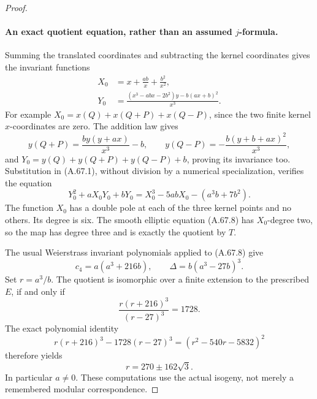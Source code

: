 \begin{proof}
\paragraph{An exact quotient equation, rather than an assumed \(j\)-formula.}
Summing the translated coordinates and subtracting the kernel
coordinates gives the invariant functions
\[
\begin{split}
 X_0&=x+\frac{ab}{x}+\frac{b^2}{x^2},\\
 Y_0&=\frac{(x^3-abx-2b^2)y-b(ax+b)^2}{x^3}.
\end{split}                                                   \tag{A.67.7}
\]
For example \(X_0=x(Q)+x(Q+P)+x(Q-P)\), since the two finite
kernel \(x\)-coordinates are zero. The addition law gives
\[
 y(Q+P)=\frac{by(y+ax)}{x^3}-b,\qquad
 y(Q-P)=-\frac{b(y+b+ax)^2}{x^3},
\]
and \(Y_0=y(Q)+y(Q+P)+y(Q-P)+b\), proving its invariance too.
Substitution in (A.67.1), without division by a numerical
specialization, verifies the equation
\[
 Y_0^2+aX_0Y_0+bY_0
       =X_0^3-5abX_0-(a^3b+7b^2).
                                                               \tag{A.67.8}
\]
The function \(X_0\) has a double pole at each of the three
kernel points and no others. Its degree is six. The smooth
elliptic equation (A.67.8) has \(X_0\)-degree two, so the map
has degree three and is exactly the quotient by \(T\).

The usual Weierstrass invariant polynomials applied to
(A.67.8) give
\[
 c_4=a(a^3+216b),\qquad
 \Delta=b(a^3-27b)^3.
                                                               \tag{A.67.9}
\]
Set \(r=a^3/b\). The quotient is isomorphic over a finite
extension to the prescribed \(E\), if and only if
\[
 \frac{r(r+216)^3}{(r-27)^3}=1728.
\]
The exact polynomial identity
\[
 r(r+216)^3-1728(r-27)^3=(r^2-540r-5832)^2
                                                               \tag{A.67.10}
\]
therefore yields
\[
                         r=270\pm162\sqrt3.
                                                               \tag{A.67.11}
\]
In particular \(a\ne0\). These computations use the actual
isogeny, not merely a remembered modular correspondence.


\end{proof}
